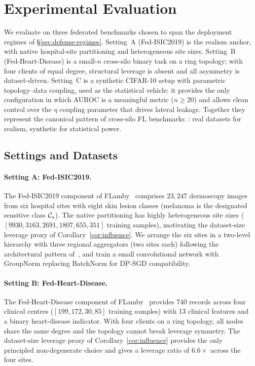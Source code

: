 \section{Experimental Evaluation}
\label{sec:experiments}

We evaluate \Fulcrum on three federated benchmarks chosen to span the
deployment regimes of \S\ref{sec:defense-regimes}. Setting~A
(Fed-ISIC2019) is the realism anchor, with native hospital-site
partitioning and heterogeneous site sizes. Setting~B
(Fed-Heart-Disease) is a small-$n$ cross-silo binary task on a ring
topology; with four clients of equal degree, structural leverage is
absent and all asymmetry is dataset-driven. Setting~C is a synthetic
CIFAR-10 setup with parametric topology--data coupling, used as the
statistical vehicle: it provides the only configuration in which AUROC
is a meaningful metric ($n \geq 20$) and allows clean control over the
$\eta$ coupling parameter that drives lateral leakage. Together they
represent the canonical pattern of cross-silo FL
benchmarks~\cite{flamby2022}: real datasets for realism, synthetic for
statistical power.

\subsection{Settings and Datasets}
\label{sec:experiments-settings}

\paragraph{Setting A: Fed-ISIC2019.}
The Fed-ISIC2019 component of FLamby~\cite{flamby2022} comprises
\(23{,}247\) dermoscopy images from six hospital sites with eight skin
lesion classes (melanoma is the designated sensitive class \(\mathcal{C}_{s}\)).
The native partitioning has highly heterogeneous site sizes
(\([9930, 3163, 2691, 1807, 655, 351]\) training samples), motivating
the dataset-size leverage proxy of Corollary~\ref{cor:influence}. We
arrange the six sites in a two-level hierarchy with three regional
aggregators (two sites each) following the architectural pattern
of~\cite{liu2020hierarchical}, and train a small convolutional network
with GroupNorm replacing BatchNorm for DP-SGD compatibility.

\paragraph{Setting B: Fed-Heart-Disease.}
The Fed-Heart-Disease component of FLamby~\cite{flamby2022} provides
\(740\) records across four clinical centres (\([199, 172, 30, 85]\)
training samples) with 13 clinical features and a binary heart-disease
indicator. With four clients on a ring topology, all nodes share the
same degree and the topology cannot break leverage symmetry. The
dataset-size leverage proxy of Corollary~\ref{cor:influence} provides
the only principled non-degenerate choice and gives a leverage ratio
of $6.6\times$ across the four sites.

